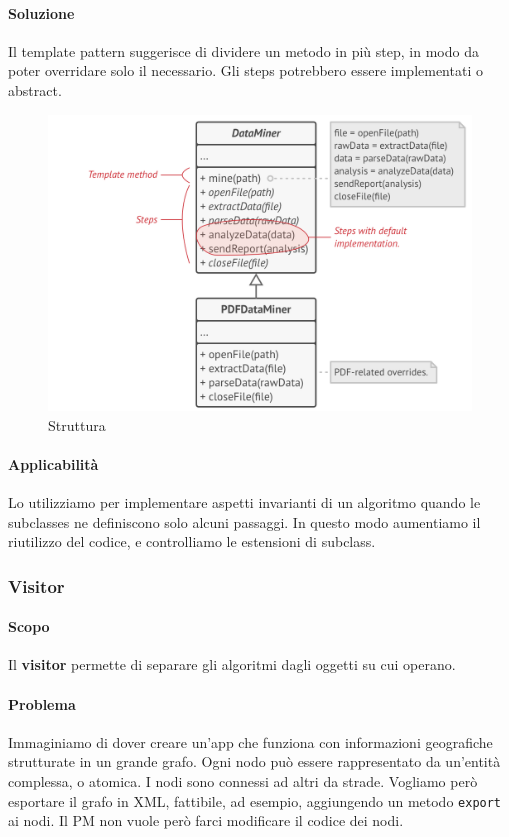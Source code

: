 \documentclass[11pt]{article}
\newcommand{\code}[1]{\texttt{#1}}
\begin{document}
\paragraph{Soluzione}
Il template pattern suggerisce di dividere un metodo in più step, in modo da poter overridare solo il necessario. Gli steps potrebbero essere implementati o abstract. 
\begin{figure}[H]
    \includegraphics[width=\linewidth]{res/teoria/Template.png}
    \caption{Struttura}
\end{figure}
\paragraph{Applicabilità}
Lo utilizziamo per implementare aspetti invarianti di un algoritmo quando le subclasses ne definiscono solo alcuni passaggi. In questo modo aumentiamo il riutilizzo del codice, e controlliamo le estensioni di subclass.

\subsubsection{Visitor}
\paragraph{Scopo}
Il \textbf{visitor} permette di separare gli algoritmi dagli oggetti su cui operano. 
\paragraph{Problema}
Immaginiamo di dover creare un'app che funziona con informazioni geografiche strutturate in un grande grafo. Ogni nodo può essere rappresentato da un'entità complessa, o atomica. I nodi sono connessi ad altri da strade. Vogliamo però esportare il grafo in XML, fattibile, ad esempio, aggiungendo un metodo \code{export} ai nodi. Il PM non vuole però farci modificare il codice dei nodi. 
\end{document}
